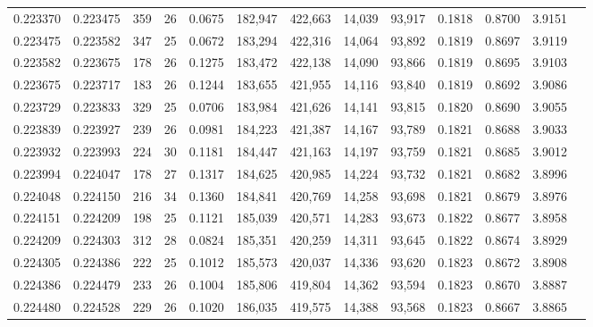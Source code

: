 \begin{tabular}{rrrrrrrrrrrrr}
0.223370 & 0.223475 &   359 &  26 &                                     0.0675 & 182,947 & 422,663 &  14,039 &  93,917 & 0.1818 & 0.8700 & 3.9151 \\
0.223475 & 0.223582 &   347 &  25 &                                     0.0672 & 183,294 & 422,316 &  14,064 &  93,892 & 0.1819 & 0.8697 & 3.9119 \\
0.223582 & 0.223675 &   178 &  26 &                                     0.1275 & 183,472 & 422,138 &  14,090 &  93,866 & 0.1819 & 0.8695 & 3.9103 \\
0.223675 & 0.223717 &   183 &  26 &                                     0.1244 & 183,655 & 421,955 &  14,116 &  93,840 & 0.1819 & 0.8692 & 3.9086 \\
0.223729 & 0.223833 &   329 &  25 &                                     0.0706 & 183,984 & 421,626 &  14,141 &  93,815 & 0.1820 & 0.8690 & 3.9055 \\
0.223839 & 0.223927 &   239 &  26 &                                     0.0981 & 184,223 & 421,387 &  14,167 &  93,789 & 0.1821 & 0.8688 & 3.9033 \\
0.223932 & 0.223993 &   224 &  30 &                                     0.1181 & 184,447 & 421,163 &  14,197 &  93,759 & 0.1821 & 0.8685 & 3.9012 \\
0.223994 & 0.224047 &   178 &  27 &                                     0.1317 & 184,625 & 420,985 &  14,224 &  93,732 & 0.1821 & 0.8682 & 3.8996 \\
0.224048 & 0.224150 &   216 &  34 &                                     0.1360 & 184,841 & 420,769 &  14,258 &  93,698 & 0.1821 & 0.8679 & 3.8976 \\
0.224151 & 0.224209 &   198 &  25 &                                     0.1121 & 185,039 & 420,571 &  14,283 &  93,673 & 0.1822 & 0.8677 & 3.8958 \\
0.224209 & 0.224303 &   312 &  28 &                                     0.0824 & 185,351 & 420,259 &  14,311 &  93,645 & 0.1822 & 0.8674 & 3.8929 \\
0.224305 & 0.224386 &   222 &  25 &                                     0.1012 & 185,573 & 420,037 &  14,336 &  93,620 & 0.1823 & 0.8672 & 3.8908 \\
0.224386 & 0.224479 &   233 &  26 &                                     0.1004 & 185,806 & 419,804 &  14,362 &  93,594 & 0.1823 & 0.8670 & 3.8887 \\
0.224480 & 0.224528 &   229 &  26 &                                     0.1020 & 186,035 & 419,575 &  14,388 &  93,568 & 0.1823 & 0.8667 & 3.8865 \\

\end{tabular}
